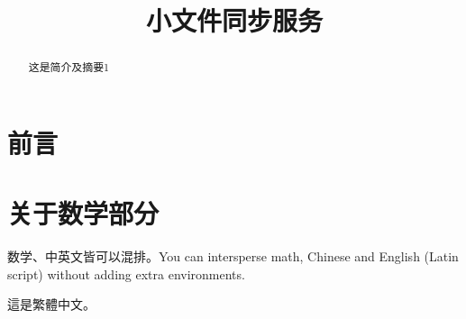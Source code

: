 \documentclass{ctexart}
\title{小文件同步服务}
\begin{document}
\tableofcontents

\begin{abstract}
这是简介及摘要1
\end{abstract}

\section{前言}

\section{关于数学部分}
数学、中英文皆可以混排。You can intersperse math, Chinese and English (Latin script) without
adding extra environments.

這是繁體中文。
\end{document}

